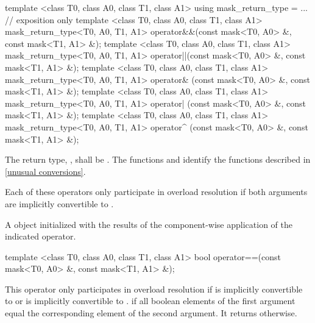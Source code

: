 
\begin{itemdecl}
template <class T0, class A0, class T1, class A1> using mask_return_type = ...  // exposition only
template <class T0, class A0, class T1, class A1>
mask_return_type<T0, A0, T1, A1> operator&&(const mask<T0, A0> &, const mask<T1, A1> &);
template <class T0, class A0, class T1, class A1>
mask_return_type<T0, A0, T1, A1> operator||(const mask<T0, A0> &, const mask<T1, A1> &);
template <class T0, class A0, class T1, class A1>
mask_return_type<T0, A0, T1, A1> operator& (const mask<T0, A0> &, const mask<T1, A1> &);
template <class T0, class A0, class T1, class A1>
mask_return_type<T0, A0, T1, A1> operator| (const mask<T0, A0> &, const mask<T1, A1> &);
template <class T0, class A0, class T1, class A1>
mask_return_type<T0, A0, T1, A1> operator^ (const mask<T0, A0> &, const mask<T1, A1> &);
\end{itemdecl}
\begin{itemdescr}
  \newcommand\maskreturntype{\xspace}
  \pnum\remarks The return type, \maskreturntype, shall be .
    The functions  and  identify the functions described in \ref{unusual conversions}.

  \pnum\remarks Each of these operators only participate in overload resolution if both arguments are implicitly convertible to \maskreturntype.

  \pnum\returns A \mask object initialized with the results of the component-wise application of the indicated operator.
\end{itemdescr}

\begin{itemdecl}
template <class T0, class A0, class T1, class A1>
bool operator==(const mask<T0, A0> &, const mask<T1, A1> &);
\end{itemdecl}
\newcommand\maskCompareRemark{\pnum\remarks This operator only participates in overload resolution if \mask[<T0, A0>] is implicitly convertible to \mask[<T1, A1>] or \mask[<T1, A1>] is implicitly convertible to \mask[<T0, A0>].}
\begin{itemdescr}
  \maskCompareRemark
  \pnum\returns \true if all boolean elements of the first argument equal the corresponding element of the second argument.
  It returns \false otherwise.
\end{itemdescr}

